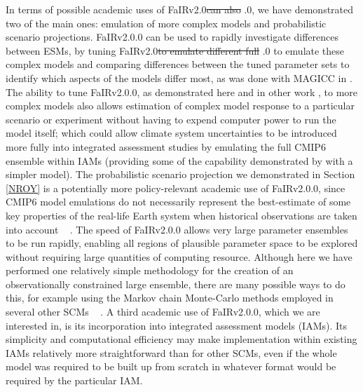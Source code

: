 \documentclass[gmd, manuscript]{copernicus}
\providecommand{\DIFadd}[1]{{\protect\color{blue}#1}} %
\providecommand{\DIFdel}[1]{{\protect\color{red}\sout{#1}}}                      %
\providecommand{\DIFaddbegin}{} %
\providecommand{\DIFaddend}{} %
\providecommand{\DIFdelbegin}{} %
\providecommand{\DIFdelend}{} %
\begin{document}
\DIFaddbegin \DIFadd{In terms of possible academic uses of }\DIFaddend FaIRv2.0\DIFdelbegin \DIFdel{can also }\DIFdelend \DIFaddbegin \DIFadd{.0, we have demonstrated two of the main ones: emulation of more complex models and probabilistic scenario projections. FaIRv2.0.0 can }\DIFaddend be used to rapidly investigate differences between ESMs, \DIFaddbegin \DIFadd{by }\DIFaddend tuning FaIRv2.0\DIFdelbegin \DIFdel{to emulate different full }\DIFdelend \DIFaddbegin \DIFadd{.0 to emulate these complex }\DIFaddend models and comparing differences between the tuned parameter sets to identify which aspects of the models differ most, as was done with MAGICC in \cite{Meinshausen2011,Meinshausen2011b}. The ability to tune FaIRv2.0\DIFaddbegin \DIFadd{.0}\DIFaddend , as demonstrated here and in other work \citep{Tsutsui2017,Joos2013,Millar2016}, to more complex models also allows estimation of complex model response to a particular scenario or experiment without having to expend computer power to run the model itself; which could allow climate system uncertainties to be introduced more fully into integrated assessment studies by emulating the full CMIP6 ensemble within IAMs (providing some of the capability demonstrated by \cite{Meinshausen2011} with a simpler model). \DIFaddbegin \DIFadd{The probabilistic scenario projection we demonstrated in Section \ref{NROY} is a potentially more policy-relevant academic use of FaIRv2.0.0, since CMIP6 model emulations do not necessarily represent the best-estimate of some key properties of the real-life Earth system when historical observations are taken into account \mbox{%
\citep{Tokarska2020a, Gillett2021}}\hspace{0pt}%
. The speed of FaIRv2.0.0 allows very large parameter ensembles to be run rapidly, enabling all regions of plausible parameter space to be explored without requiring large quantities of computing resource. Although here we have performed one relatively simple methodology for the creation of an observationally constrained large ensemble, there are many possible ways to do this, for example using the Markov chain Monte-Carlo methods employed in several other SCMs \mbox{%
\citep{Nicholls2020,Meinshausen2019,Meinshausen2011b}}\hspace{0pt}%
. A third academic use of FaIRv2.0.0, which we are interested in, is its incorporation into integrated assessment models (IAMs). Its simplicity and computational efficiency may make implementation within existing IAMs relatively more straightforward than for other SCMs, even if the whole model was required to be built up from scratch in whatever format would be required by the particular IAM.}\\\\
\end{document}
